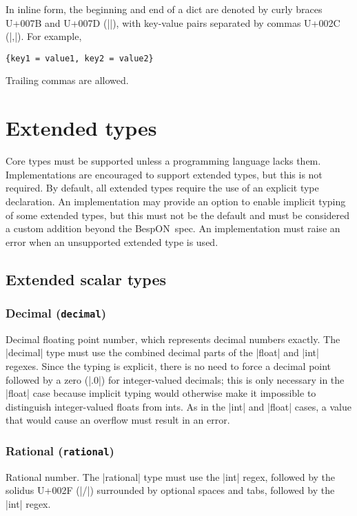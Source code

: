 \documentclass[11pt]{article}
\newcommand{\bespon}{BespON}
\begin{document}
In inline form, the beginning and end of a dict are denoted by curly braces U+007B and U+007D (|{}|), with key-value pairs separated by commas U+002C (|,|).  For example,
\begin{Verbatim}
{key1 = value1, key2 = value2}
\end{Verbatim}
Trailing commas are allowed.




\section{Extended types}

Core types must be supported unless a programming language lacks them.  Implementations are encouraged to support extended types, but this is not required.  By default, all extended types require the use of an explicit type declaration.  An implementation may provide an option to enable implicit typing of some extended types, but this must not be the default and must be considered a custom addition beyond the \bespon\ spec.  An implementation must raise an error when an unsupported extended type is used.


\subsection{Extended scalar types}

\subsubsection{Decimal (\texttt{decimal})}

Decimal floating point number, which represents decimal numbers exactly.  The |decimal| type must use the combined decimal parts of the |float| and |int| regexes.  Since the typing is explicit, there is no need to force a decimal point followed by a zero (|.0|) for integer-valued decimals; this is only necessary in the |float| case because implicit typing would otherwise make it impossible to distinguish integer-valued floats from ints.  As in the |int| and |float| cases, a value that would cause an overflow must result in an error.


\subsubsection{Rational (\texttt{rational})}

Rational number.  The |rational| type must use the |int| regex, followed by the solidus U+002F (|/|) surrounded by optional spaces and tabs, followed by the |int| regex.
\end{document}
